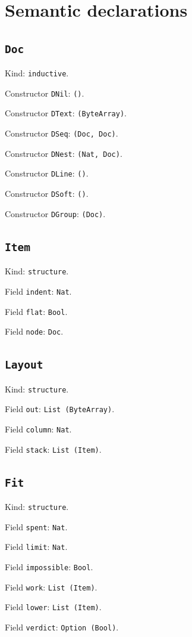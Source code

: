 \documentclass[11pt]{article}
\begin{document}
\section*{Semantic declarations}
\subsection*{\texttt{Doc}}
\noindent Kind: \texttt{inductive}.\par
\noindent Constructor \texttt{DNil}: \texttt{()}.\par
\noindent Constructor \texttt{DText}: \texttt{(ByteArray)}.\par
\noindent Constructor \texttt{DSeq}: \texttt{(Doc, Doc)}.\par
\noindent Constructor \texttt{DNest}: \texttt{(Nat, Doc)}.\par
\noindent Constructor \texttt{DLine}: \texttt{()}.\par
\noindent Constructor \texttt{DSoft}: \texttt{()}.\par
\noindent Constructor \texttt{DGroup}: \texttt{(Doc)}.\par
\subsection*{\texttt{Item}}
\noindent Kind: \texttt{structure}.\par
\noindent Field \texttt{indent}: \texttt{Nat}.\par
\noindent Field \texttt{flat}: \texttt{Bool}.\par
\noindent Field \texttt{node}: \texttt{Doc}.\par
\subsection*{\texttt{Layout}}
\noindent Kind: \texttt{structure}.\par
\noindent Field \texttt{out}: \texttt{List (ByteArray)}.\par
\noindent Field \texttt{column}: \texttt{Nat}.\par
\noindent Field \texttt{stack}: \texttt{List (Item)}.\par
\subsection*{\texttt{Fit}}
\noindent Kind: \texttt{structure}.\par
\noindent Field \texttt{spent}: \texttt{Nat}.\par
\noindent Field \texttt{limit}: \texttt{Nat}.\par
\noindent Field \texttt{impossible}: \texttt{Bool}.\par
\noindent Field \texttt{work}: \texttt{List (Item)}.\par
\noindent Field \texttt{lower}: \texttt{List (Item)}.\par
\noindent Field \texttt{verdict}: \texttt{Option (Bool)}.\par
\end{document}
